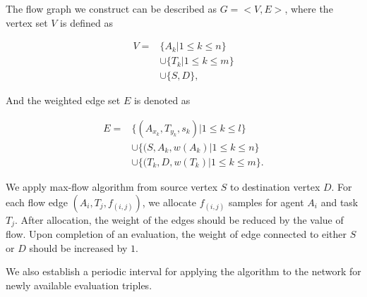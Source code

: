 The flow graph we construct can be described as $G=<V,E>$, where the vertex set $V$ is defined as

\begin{equation}
\begin{split}
    V = & \{A_k|1\le k \le n\} \\
        & \cup \{T_k|1\le k \le m\} \\
        & \cup \{S, D\},
\end{split}
\end{equation}

And the weighted edge set $E$ is denoted as

\begin{equation}
\begin{split}
    E = & \{(A_{x_k}, T_{y_k}, s_k)|1\le k \le l\} \\
        & \cup \{(S, A_k, w(A_k)|1\le k \le n\} \\
        & \cup \{(T_k, D, w(T_k)|1\le k \le m\}.
\end{split}
\end{equation}

We apply max-flow algorithm from source vertex $S$ to destination vertex $D$. For each flow edge $(A_i, T_j, f_{(i,j)})$, we allocate $f_{(i,j)}$ samples for agent $A_i$ and task $T_j$. After allocation, the weight of the edges should be reduced by the value of flow. Upon completion of an evaluation, the weight of edge connected to either $S$ or $D$ should be increased by $1$.

We also establish a periodic interval for applying the algorithm to the network for newly available evaluation triples.
